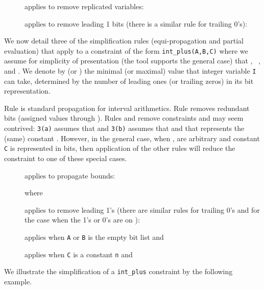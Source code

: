 \documentclass{tlp}
\begin{document}
\begin{description}
\item[] applies to remove replicated variables:


\item[] applies to remove leading 1 bits (there is a
  similar rule for trailing 0's):

\end{description}

We now detail three of the simplification rules (equi-propagation and
partial evaluation) that apply to a constraint of the form
\texttt{int\_plus(A,B,C)} where we assume for simplicity of
presentation (the tool supports the general case) that
, ~, and
. We denote by  (or
) the minimal (or maximal) value that integer
variable \texttt{I} can take, determined by the number of leading ones
(or trailing zeros) in its bit representation.

Rule  is standard propagation for interval
arithmetics.  Rule  removes redundant bits 
(assigned values through ).
Rules  and  remove
constraints and may seem contrived: \texttt{{3(a)}} assumes that
 and \texttt{{3(b)}} assumes that  and
that  represents the (same) constant . 
However, in the general case, when ,  are
arbitrary and constant \texttt{C} is represented in 
bits, then application of the other rules will reduce the constraint
to one of these special cases.

\begin{description}
\item[] applies to propagate bounds:

where \\
\hspace*{-7mm}\smallskip
\item[] applies to remove leading 1's  
 (there are similar rules for trailing 0's and for the case when
 the 1's or 0's are on ):

\item[] applies when \texttt{A} or \texttt{B}
  is the empty bit list and 



\item[] applies when \texttt{C} is a constant
  \texttt{n} and 

  
\end{description}

We illustrate the simplification of a \texttt{int\_plus} constraint by
the following example.
\end{document}
